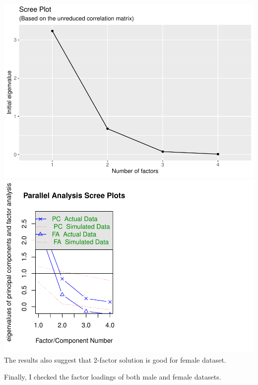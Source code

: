 \documentclass[
]{article}
\begin{document}
\includegraphics[width=0.5\linewidth,height=0.5\textheight]{HUDM6122-Homework_05-Chenguang-Pan_files/figure-latex/unnamed-chunk-8-1}
\includegraphics[width=0.5\linewidth,height=0.5\textheight]{HUDM6122-Homework_05-Chenguang-Pan_files/figure-latex/unnamed-chunk-8-2}
The results also suggest that 2-factor solution is good for female
dataset.

Finally, I checked the factor loadings of both male and female datasets.
\end{document}
